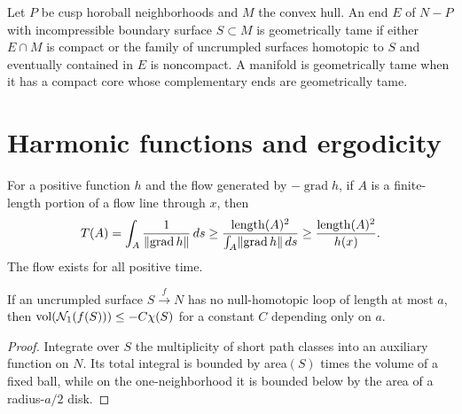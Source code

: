 \begin{definition}
\label{thurston-ch08-geometrically-tame-end}
Let $P$ be cusp horoball neighborhoods and $M$ the convex hull.  An end $E$ of $N-P$ with incompressible boundary surface $S\subset M$ is geometrically tame if either $E\cap M$ is compact or the family of uncrumpled surfaces homotopic to $S$ and eventually contained in $E$ is noncompact.  A manifold is geometrically tame when it has a compact core whose complementary ends are geometrically tame.
\end{definition}

\section{Harmonic functions and ergodicity}

\begin{proposition}
\label{thurston-ch08-flow-time-estimate}
For a positive function $h$ and the flow generated by $-\operatorname{grad}h$, if $A$ is a finite-length portion of a flow line through $x$, then
\[
T(A)=\int_A\frac{1}{\lVert \operatorname{grad}h\rVert}\,ds\geq\frac{\operatorname{length}(A)^2}{\int_A\lVert \operatorname{grad}h\rVert\,ds}\geq\frac{\operatorname{length}(A)^2}{h(x)}.
\]
The flow exists for all positive time.
\end{proposition}

\begin{proposition}
\label{thurston-ch08-uncrumpled-neighborhood-volume}
If an uncrumpled surface $S\xrightarrow f N$ has no null-homotopic loop of length at most $a$, then $\operatorname{vol}(\mathcal N_1(f(S)))\leq-C\chi(S)$ for a constant $C$ depending only on $a$.
\end{proposition}
\begin{proof}\sketch Integrate over $S$ the multiplicity of short path classes into an auxiliary function on $N$.  Its total integral is bounded by area$(S)$ times the volume of a fixed ball, while on the one-neighborhood it is bounded below by the area of a radius-$a/2$ disk.\end{proof}

